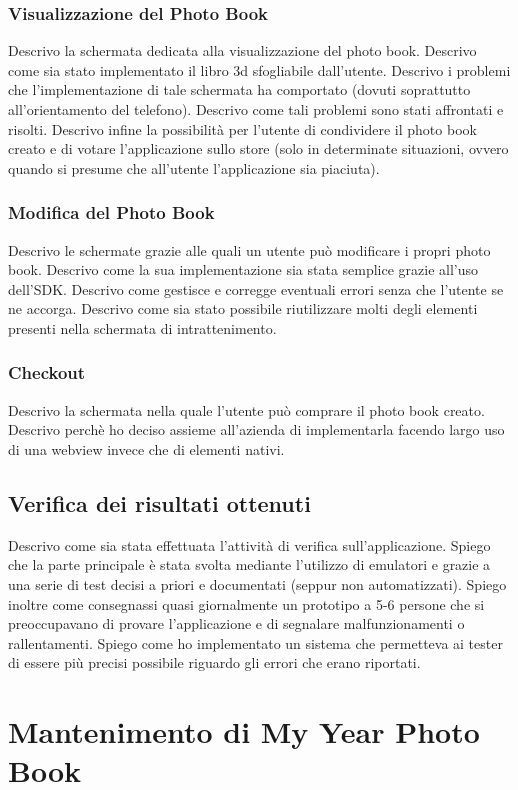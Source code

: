 			\subsubsection{Visualizzazione del Photo Book}
				Descrivo la schermata dedicata alla visualizzazione del photo book. Descrivo come sia stato implementato il libro
				3d sfogliabile dall'utente. Descrivo i problemi che l'implementazione di tale schermata ha comportato (dovuti
				soprattutto all'orientamento del telefono). Descrivo come tali problemi sono stati affrontati e risolti. Descrivo
				infine la possibilità per l'utente di condividere il photo book creato e di votare l'applicazione sullo store
				(solo in determinate situazioni, ovvero quando si presume che all'utente l'applicazione sia piaciuta).
			\subsubsection{Modifica del Photo Book}
				Descrivo le schermate grazie alle quali un utente può modificare i propri photo book. Descrivo come la sua
				implementazione sia stata semplice grazie all'uso dell'SDK. Descrivo come gestisce e corregge eventuali errori senza
				che l'utente se ne accorga. Descrivo come sia stato possibile riutilizzare molti degli elementi presenti nella
				schermata di intrattenimento.
			\subsubsection{Checkout}
				Descrivo la schermata nella quale l'utente può comprare il photo book creato. Descrivo perchè ho deciso assieme
				all'azienda di implementarla facendo largo uso di una webview invece che di elementi nativi.
		\subsection{Verifica dei risultati ottenuti}
			Descrivo come sia stata effettuata l'attività di verifica sull'applicazione. Spiego che la parte principale è stata
			svolta mediante l'utilizzo di emulatori e grazie a una serie di test decisi a priori e documentati (seppur non
			automatizzati). Spiego inoltre come consegnassi quasi giornalmente un prototipo a 5-6 persone che si preoccupavano
			di provare l'applicazione e di segnalare malfunzionamenti o rallentamenti. Spiego come ho implementato un sistema
			che permetteva ai tester di essere più precisi possibile riguardo gli errori che erano riportati.
	\section{Mantenimento di My Year Photo Book}
